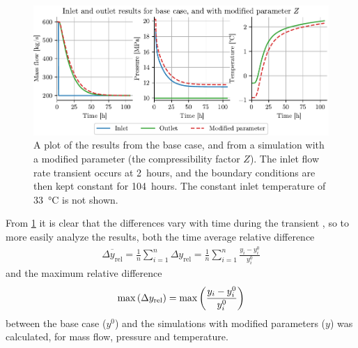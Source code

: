 \begin{figure}[!ht]%
    \centering%
    \includegraphics{figures/base_case_with_adjusted_Z_horiz.pdf}%
    \caption{%
        A plot of the results from the base case, and from a simulation with a modified parameter (the compressibility factor $Z$). The inlet flow rate transient occurs at 2~hours, and the boundary conditions are then kept constant for 104~hours. The constant inlet temperature of \SI{33}{\celsius} is not shown.
        \label{fig:baseCaseWithZ}%
    }%
\end{figure}%
From \cref{fig:baseCaseWithZ} it is clear that the differences vary with time during the transient%
, so to more easily analyze the results, both the time average relative difference
\begin{align}
    \overbar{\Delta y_\mathrm{rel}}
    = \frac{1}{n} \sum_{i=1}^n \Delta y_\mathrm{rel}
    = \frac{1}{n} \sum_{i=1}^n \frac{y_i - y_i^0}{y_i^0}
\end{align}
and the maximum relative difference
\begin{align}
    \max\del{\Delta y_\mathrm{rel}} = \max\del{\frac{y_i - y_i^0}{y_i^0}}
\end{align}
between the base case ($y^0$) and the simulations with modified parameters ($y$) was calculated, for mass flow, pressure and temperature. %
